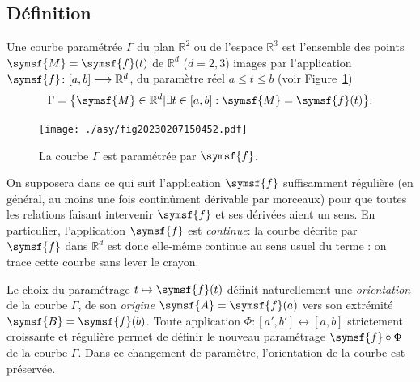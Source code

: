 \documentclass[
  a4paper,
  DIV=11,
  numbers=noendperiod]{scrreprt}
\newcommand{\point}[1]{\symsf{#1}}
\newcommand{\reals}{\mathbb R}
\begin{document}
\hypertarget{duxe9finition-1}{%
\subsection{Définition}\label{duxe9finition-1}}

Une courbe paramétrée \(\Gamma\) du plan \(\reals^2\) ou de l'espace
\(\reals^3\) est l'ensemble des points \(\point{M} = \point{f}(t)\) de
\(\reals^d\) (\(d = 2, 3\)) images par l'application
\(\point{f} \colon [a, b] \longrightarrow \reals^d\), du paramètre réel
\(a \leq t \leq b\) (voir Figure~\ref{fig-20230207150452}) \[
\Gamma = \bigl\{ \point{M} \in \reals^d | \exists t \in [a, b]: \point{M} = \point{f}(t) \bigr\}.
\]

\begin{figure}

{\centering \texttt{[image: ./asy/fig20230207150452.pdf]}

}

\caption{\label{fig-20230207150452}La courbe \(\Gamma\) est paramétrée
par \(\point{f}\).}

\end{figure}

On supposera dans ce qui suit l'application \(\point{f}\) suffisamment
régulière (en général, au moins une fois continûment dérivable par
morceaux) pour que toutes les relations faisant intervenir \(\point{f}\)
et ses dérivées aient un sens. En particulier, l'application
\(\point{f}\) est \emph{continue}: la courbe décrite par \(\point{f}\)
dans \(\reals^d\) est donc elle-même continue au sens usuel du terme :
on trace cette courbe sans lever le crayon.

Le choix du paramétrage \(t \mapsto \point{f}(t)\) définit naturellement
une \emph{orientation} de la courbe \(\Gamma\), de son \emph{origine}
\(\point{A} = \point{f}(a)\) vers son extrémité
\(\point{B} = \point{f}(b)\). Toute application
\(\Phi\colon [a', b'] \longleftrightarrow [a, b]\) strictement
croissante et régulière permet de définir le nouveau paramétrage
\(\point{f} \circ \Phi\) de la courbe \(\Gamma\). Dans ce changement de
paramètre, l'orientation de la courbe est préservée.
\end{document}
